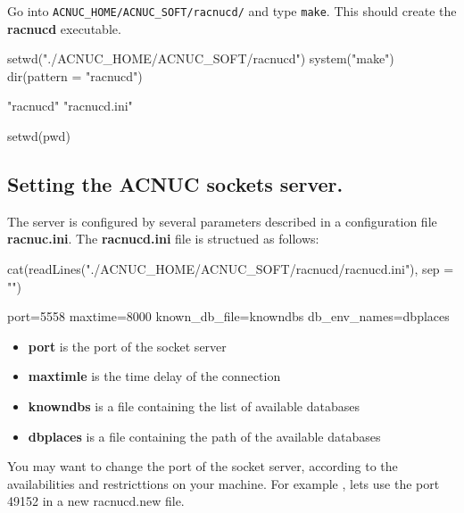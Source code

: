 \documentclass{article}
\begin{document}
Go into \texttt{ACNUC\_HOME/ACNUC\_SOFT/racnucd/} and type \texttt{make}.
This should create the \textbf{racnucd} executable.

\begin{Schunk}
\begin{Sinput}
 setwd("./ACNUC_HOME/ACNUC_SOFT/racnucd")
 system("make")
 dir(pattern = "racnucd")
\end{Sinput}
\begin{Soutput}
[1] "racnucd"     "racnucd.ini"
\end{Soutput}
\begin{Sinput}
 setwd(pwd)
\end{Sinput}
\end{Schunk}

\subsection{Setting the ACNUC sockets server.}

The server is configured by several parameters described in a configuration file \textbf{racnuc.ini}.
The \textbf{racnucd.ini} file is structued as follows:


\begin{Schunk}
\begin{Sinput}
 cat(readLines("./ACNUC_HOME/ACNUC_SOFT/racnucd/racnucd.ini"), 
     sep = "\n")
\end{Sinput}
\begin{Soutput}
port=5558
maxtime=8000
known_db_file=knowndbs
db_env_names=dbplaces
\end{Soutput}
\end{Schunk}

\begin{itemize}
\item \textbf{port} is the port of the socket server 
\item \textbf{maxtimle} is the time delay of the connection
\item \textbf{knowndbs} is a file containing the list of available databases
\item \textbf{dbplaces} is a file containing the path of the available databases
\end{itemize}



You may want to change the port of the socket server, according to the availabilities and restricttions on your machine.
For example , lets use the port 49152 in a new racnucd.new file.
\end{document}
